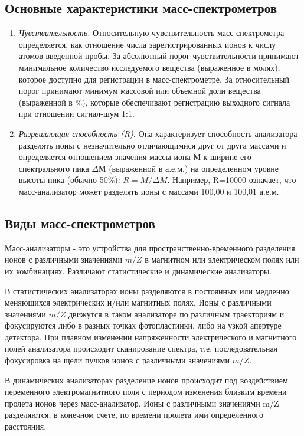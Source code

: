 \documentclass[a4paper, 12pt]{article}
\begin{document}
	\subsection{Основные характеристики масс-спектрометров}
	\begin{enumerate}
		\item \textit{Чувствительность.} Относительную чувствительность масс-спектрометра определяется, как отношение числа зарегистрированных ионов к числу атомов введенной пробы. За абсолютный порог чувствительности принимают минимальное количество исследуемого вещества (выраженное в молях), которое доступно для регистрации в масс-спектрометре. За относительный порог принимают минимум массовой или объемной доли вещества (выраженной в \%), которые обеспечивают регистрацию выходного сигнала при отношении сигнал-шум 1:1.
		\item \textit{Разрешающая способность (R).} Она характеризует способность анализатора разделять ионы с незначительно отличающимися друг от друга массами и определяется отношением значения массы иона М к ширине его спектрального пика $\Delta М$ (выраженной в а.е.м.) на определенном уровне высоты пика (обычно 50\%): $R=M/\Delta M$. Например, R=10000 означает, что масс-анализатор может разделять ионы с массами 100,00 и 100,01 а.е.м.
	\end{enumerate}
	\subsection{Виды масс-спектрометров}
	Масс-анализаторы - это устройства для пространственно-временного разделения ионов с различными значениями $m/Z$ в магнитном или электрическом полях или их комбинациях. Различают статистические и динамические анализаторы.\par
	В статистических анализаторах ионы разделяются в постоянных или медленно меняющихся электрических и/или магнитных полях. Ионы с различными значениями $m/Z$ движутся в таком анализаторе по различным траекториям и фокусируются либо в разных точках фотопластинки, либо на узкой апертуре детектора. При плавном изменении напряженности электрического и магнитного полей анализатора происходит сканирование спектра, т.е. последовательная фокусировка на щели пучков ионов с различными значениями $m/Z$.\par
	В динамических анализаторах разделение ионов происходит под воздействием переменного электромагнитного поля с периодом изменения близким времени пролета ионов через масс-анализатор. Ионы с различными значениями m/Z разделяются, в конечном счете, по времени пролета ими определенного расстояния.
\end{document}
